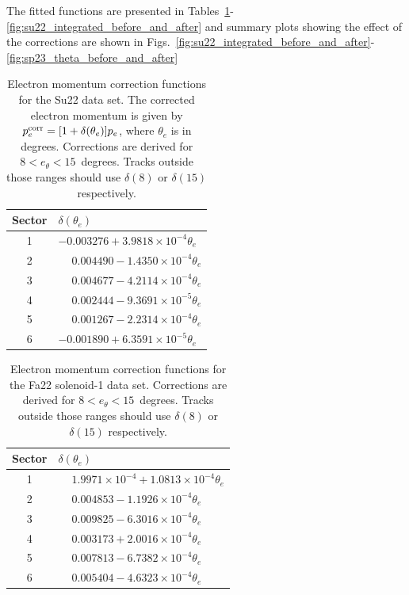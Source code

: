 The fitted functions are presented in Tables~\ref{tab:Su22_electron_momentum_corrections}-\ref{fig:su22_integrated_before_and_after} and summary plots showing the effect of the corrections are shown in Figs.~\ref{fig:su22_integrated_before_and_after}-\ref{fig:sp23_theta_before_and_after}

\begin{table}[htbp]
\centering
\begin{tabular}{cl}
\toprule
Sector & $\delta(\theta_e)$ \\
\midrule
1 & $-0.003276 + 3.9818\times10^{-4}\theta_e$ \\
2 & $\phantom{-}0.004490 - 1.4350\times10^{-4}\theta_e$ \\
3 & $\phantom{-}0.004677 - 4.2114\times10^{-4}\theta_e$ \\
4 & $\phantom{-}0.002444 - 9.3691\times10^{-5}\theta_e$ \\
5 & $\phantom{-}0.001267 - 2.2314\times10^{-4}\theta_e$ \\
6 & $-0.001890 + 6.3591\times10^{-5}\theta_e$ \\
\bottomrule
\end{tabular}
\caption{Electron momentum correction functions for the Su22 data set. The corrected electron momentum is given by
$p_e^{\rm corr}=[1+\delta(\theta_e)]p_e$, where $\theta_e$ is in degrees. Corrections are derived for $8 < e_\theta < 15$~degrees. Tracks outside those ranges should use $\delta(8)$ or $\delta(15)$ respectively.}
\label{tab:Su22_electron_momentum_corrections}
\end{table}

\begin{table}[htbp]
\centering
\begin{tabular}{cl}
\toprule
Sector & $\delta(\theta_e)$ \\
\midrule
1 & $\phantom{-}1.9971\times10^{-4} + 1.0813\times10^{-4}\theta_e$ \\
2 & $\phantom{-}0.004853 - 1.1926\times10^{-4}\theta_e$ \\
3 & $\phantom{-}0.009825 - 6.3016\times10^{-4}\theta_e$ \\
4 & $\phantom{-}0.003173 + 2.0016\times10^{-4}\theta_e$ \\
5 & $\phantom{-}0.007813 - 6.7382\times10^{-4}\theta_e$ \\
6 & $\phantom{-}0.005404 - 4.6323\times10^{-4}\theta_e$ \\
\bottomrule
\end{tabular}
\caption{Electron momentum correction functions for the Fa22 solenoid-1 data set. Corrections are derived for $8 < e_\theta < 15$~degrees. Tracks outside those ranges should use $\delta(8)$ or $\delta(15)$ respectively.}
\label{tab:Fa22-1_electron_momentum_corrections}
\end{table}

